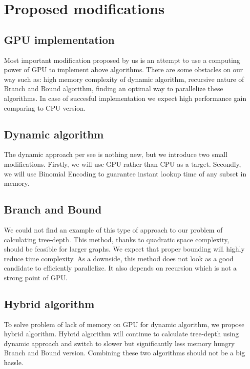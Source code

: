 \section{Proposed modifications}
\subsection{GPU implementation}
Most important modification proposed by us is an attempt to use a computing power of GPU to implement above algorithms.
There are some obstacles on our way such as: high memory complexity of dynamic algorithm, recursive nature of Branch and Bound algorithm, finding an optimal way to parallelize these algorithms. In case of succesful implementation we expect high performance gain comparing to CPU version.

\subsection{Dynamic algorithm}
The dynamic approach per see is nothing new, but we introduce two small modifications. Firstly, we will use GPU rather than CPU as a target. Secondly, we will use Binomial Encoding to guarantee instant lookup time of any subset in memory.

\subsection{Branch and Bound}
We could not find an example of this type of approach to our problem of calculating tree-depth. This method, thanks to quadratic space complexity, should be feasible for larger graphs. We expect that proper bounding will highly reduce time complexity.
As a downside, this method does not look as a good candidate to efficiently parallelize. It also depends on recursion which is not a strong point of GPU.

\subsection{Hybrid algorithm}
To solve problem of lack of memory on GPU for dynamic algorithm, we propose hybrid algorithm. Hybrid algorithm will continue to calculate tree-depth using dynamic approach and switch to slower but significantly less memory hungry Branch and Bound version.
Combining these two algorithms should not be a big hassle.
